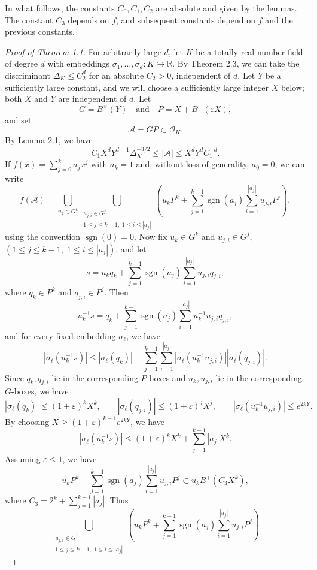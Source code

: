 \documentclass[10pt,a4paper]{amsart}
\def\R{\mathbb{R}} %
\renewcommand{\epsilon}{\varepsilon} %
\begin{document}
\begin{remark}
    In what follows, the constants $C_0,C_1,C_2$ are absolute and given by the lemmas. The constant $C_3$ depends on $f$, and subsequent constants depend on $f$ and the previous constants. 
\end{remark}

\begin{proof}[Proof of Theorem 1.1] For arbitrarily large $d$, let $K$ be a totally real number field of degree $d$ with embeddings $\sigma_1,\dots,\sigma_d:K\hookrightarrow\R$. By Theorem 2.3, we can take the discriminant $\Delta_K\leq C_2^d$ for an absolute $C_2>0$, independent of $d$. Let $Y$ be a sufficiently large constant, and we will choose a sufficiently large integer $X$ below; both $X$ and $Y$ are independent of $d$. Let 
\[
G=B^\times(Y)\quad\text{and}\quad P=X+B^+(\epsilon X),
\]
and set 
\[
\mathcal A=GP\subset \mathcal O_K.
\]
By Lemma 2.1, we have
\[
C_1X^dY^{d-1}\Delta_K^{-3/2}\leq |\mathcal A|\leq X^dY^dC_1^{-d}.
\tag{1}
\]
If $f(x)=\sum_{j=0}^k a_jx^j$ with $a_k=1$ and, without loss of generality, $a_0=0$, we can write
\[
f(\mathcal A)=\bigcup_{u_k\in G^k}\bigcup_{\substack{u_{j,i}\in G^j\\1\leq j\leq k-1,\;1\leq i\leq |a_j|}}\left(u_kP^k+\sum_{j=1}^{k-1}\operatorname{sgn}(a_j)\sum_{i=1}^{|a_j|}u_{j,i}P^j\right),
\]
using the convention $\operatorname{sgn}(0)=0$. Now fix $u_k\in G^k$ and $u_{j,i}\in G^j$, $(1\leq j\leq k-1,\;1\leq i\leq |a_j|)$, and let
\[
s=u_k q_k+\sum_{j=1}^{k-1}\operatorname{sgn}(a_j)\sum_{i=1}^{|a_j|}u_{j,i}q_{j,i},
\]
where $q_k\in P^k$ and $q_{j,i}\in P^j$. Then
\[
u_k^{-1}s=q_k+\sum_{j=1}^{k-1}\operatorname{sgn}(a_j)\sum_{i=1}^{|a_j|}u_k^{-1}u_{j,i}q_{j,i},
\]
and for every fixed embedding $\sigma_\ell$, we have
\[
|\sigma_\ell(u_k^{-1}s)|\leq|\sigma_\ell(q_k)|+\sum_{j=1}^{k-1}\sum_{i=1}^{|a_j|}|\sigma_\ell(u_k^{-1}u_{j,i})||\sigma_\ell(q_{j,i})|.
\]
Since $q_k,q_{j,i}$ lie in the corresponding $P$-boxes and
$u_k,u_{j,i}$ lie in the corresponding $G$-boxes, we have
\[
|\sigma_\ell(q_k)|\leq (1+\epsilon)^kX^k,\qquad
|\sigma_\ell(q_{j,i})|\leq (1+\epsilon)^jX^j,\qquad
|\sigma_\ell(u_k^{-1}u_{j,i})|\leq e^{2kY}.
\]
By choosing $X\geq (1+\epsilon)^{k-1}e^{2kY}$, we have
\[
|\sigma_\ell(u_k^{-1}s)|\leq(1+\epsilon)^kX^k+\sum_{j=1}^{k-1}|a_j|X^k.
\]
Assuming \(\epsilon\leq 1\), we have
\[u_kP^k+\sum_{j=1}^{k-1}\operatorname{sgn}(a_j)\sum_{i=1}^{|a_j|}u_{j,i}P^j\subset u_kB^+(C_3X^k),
\]
where $C_3=2^k+\sum_{j=1}^{k-1}|a_j|$. Thus
\[
\bigcup_{\substack{u_{j,i}\in G^j\\1\leq j\leq k-1,\;1\leq i\leq |a_j|}}\left(u_kP^k+\sum_{j=1}^{k-1}\operatorname{sgn}(a_j)\sum_{i=1}^{|a_j|}u_{j,i}P^j\right)
\]
\end{proof}
\end{document}
